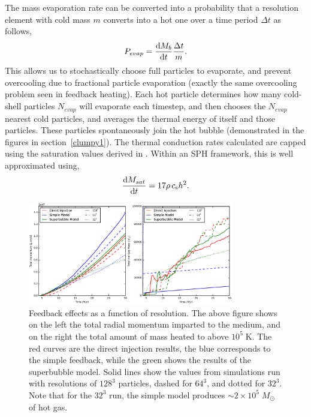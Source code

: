 The mass evaporation rate can be converted into a probability that a resolution
element with cold mass $m$ converts into a hot one over a time
period $\Delta t$ as follows, 
\begin{equation}\label{evaporation_probability1}
    P_{evap} = \frac{{\rm d}M_b}{{\rm d}t} \frac{\Delta t}{m}.
\end{equation}
This allows us to stochastically choose full particles to evaporate, and prevent
overcooling due to fractional particle evaporation (exactly the same overcooling
problem seen in feedback heating).  Each hot particle determines how many
cold-shell particles $N_{evap}$ will evaporate each timestep, and then chooses
the $N_{evap}$ nearest cold particles, and averages the thermal energy of itself
and those particles.  These particles spontaneously join the hot bubble
(demonstrated in the figures in section~\ref{clumpy1}).  The thermal conduction
rates calculated are capped using the saturation values derived in
\citet{Cowie1977}.  Within an SPH framework, this is well approximated using,
\begin{equation}\label{saturation_rate1}
    \frac{{\rm d}M_{sat}}{{\rm d}t} = 17\rho\,c_{\rm s} h^2.
\end{equation}

\begin{figure}
    \includegraphics[width=0.8\textwidth]{figures1/onestar_homogeneous.eps}
    \caption[Feedback effects as a function of resolution]{Feedback effects as a
    function of resolution.  The above figure shows on the left the total radial
    momentum imparted to the medium, and on the right the total amount of mass
    heated to above $10^5\;\mathrm{K}$.  The red curves are the direct injection
    results, the blue corresponds to the simple feedback, while the green shows
    the results of the superbubble model.  Solid lines show the values from
    simulations run with resolutions of $128^3$ particles, dashed for $64^3$,
    and dotted for $32^3$.  Note that for the $32^3$ run, the simple model
    produces $\sim 2\times 10^5\;M_\odot$ of hot gas.}
    \label{onestar_homogeneous1}
\end{figure}

